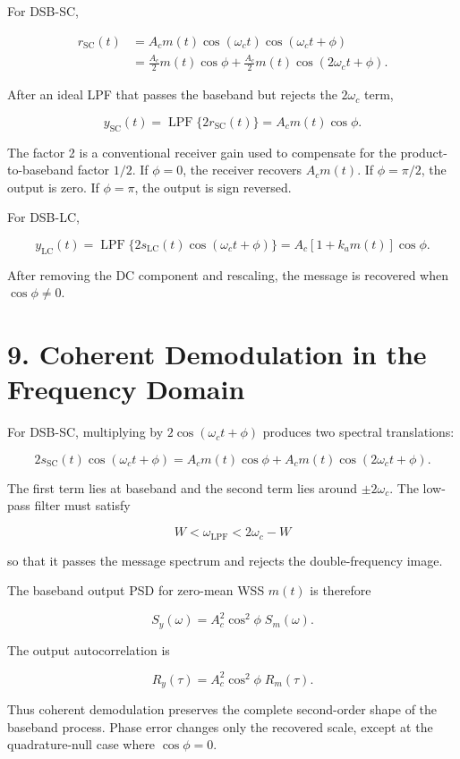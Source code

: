 \documentclass[11pt]{article}
\begin{document}
For DSB-SC,

\[
\begin{aligned}
r_{\mathrm{SC}}(t)
&=A_c m(t)\cos(\omega_c t)\cos(\omega_c t+\phi) \\
&=\frac{A_c}{2}m(t)\cos\phi
+\frac{A_c}{2}m(t)\cos(2\omega_c t+\phi).
\end{aligned}
\]

After an ideal LPF that passes the baseband but rejects the $2\omega_c$ term,

\[
y_{\mathrm{SC}}(t)=\operatorname{LPF}\{2r_{\mathrm{SC}}(t)\}=A_c m(t)\cos\phi.
\]

The factor 2 is a conventional receiver gain used to compensate for the product-to-baseband factor $1/2$. If $\phi=0$, the receiver recovers $A_c m(t)$. If $\phi=\pi/2$, the output is zero. If $\phi=\pi$, the output is sign reversed.

For DSB-LC,

\[
y_{\mathrm{LC}}(t)=\operatorname{LPF}\{2s_{\mathrm{LC}}(t)\cos(\omega_c t+\phi)\}
=A_c\left[1+k_a m(t)\right]\cos\phi.
\]

After removing the DC component and rescaling, the message is recovered when $\cos\phi\neq 0$.

\section{9. Coherent Demodulation in the Frequency Domain}

For DSB-SC, multiplying by $2\cos(\omega_c t+\phi)$ produces two spectral translations:

\[
2s_{\mathrm{SC}}(t)\cos(\omega_c t+\phi)
=A_c m(t)\cos\phi + A_c m(t)\cos(2\omega_c t+\phi).
\]

The first term lies at baseband and the second term lies around $\pm 2\omega_c$. The low-pass filter must satisfy

\[
W < \omega_{\mathrm{LPF}} < 2\omega_c-W
\]

so that it passes the message spectrum and rejects the double-frequency image.

The baseband output PSD for zero-mean WSS $m(t)$ is therefore

\[
S_y(\omega)=A_c^2\cos^2\phi\;S_m(\omega).
\]

The output autocorrelation is

\[
R_y(\tau)=A_c^2\cos^2\phi\;R_m(\tau).
\]

Thus coherent demodulation preserves the complete second-order shape of the baseband process. Phase error changes only the recovered scale, except at the quadrature-null case where $\cos\phi=0$.
\end{document}
